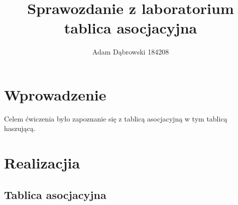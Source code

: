 \documentclass[a4paper,11pt]{report}
\title{\textbf{Sprawozdanie z laboratorium\\tablica asocjacyjna}}
\author{Adam Dąbrowski 184208}
\begin{document}
\maketitle
\chapter{Wprowadzenie}

Celem ćwiczenia było zapoznanie się z tablicą asocjacyjną w tym tablicą haszującą. 

\chapter{Realizacjia}
  
\newpage 
\section{Tablica asocjacyjna}
\end{document}
